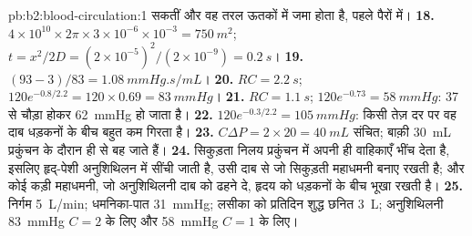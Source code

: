 \begin{solution}{pb:b2:blood-circulation:1}
सकतीं और वह तरल ऊतकों में जमा होता है, पहले पैरों में।
\textbf{18.} $4\times 10^{10}\times 2\pi\times 3\times 10^{-6}\times
10^{-3} = \qty{750}{m^2}$; $t = x^{2}/2D = (2\times 10^{-5})^{2}/
(2\times 10^{-9}) = \qty{0.2}{s}$।
\textbf{19.} $(93 - 3)/83 = \qty{1.08}{mmHg.s/mL}$।
\textbf{20.} $RC = \qty{2.2}{s}$; $120e^{-0.8/2.2} = 120\times 0.69 =
\qty{83}{mmHg}$।
\textbf{21.} $RC = \qty{1.1}{s}$; $120e^{-0.73} = \qty{58}{mmHg}$:
 37 से चौड़ा होकर \qty{62}{mmHg} हो जाता है।
\textbf{22.} $120e^{-0.3/2.2} = \qty{105}{mmHg}$: किसी तेज़ दर पर वह
दाब धड़कनों के बीच बहुत कम गिरता है।
\textbf{23.} $C\Delta P = 2\times 20 = \qty{40}{mL}$ संचित; बाक़ी
\qty{30}{mL} प्रकुंचन के दौरान ही  से बह जाते हैं।
\textbf{24.} सिकुड़ता निलय प्रकुंचन में अपनी ही वाहिकाएँ भींच देता
है, इसलिए हृद्-पेशी अनुशिथिलन में सींची जाती है, उसी
दाब से जो सिकुड़ती महाधमनी बनाए रखती है; और कोई कड़ी महाधमनी, जो
अनुशिथिलनी दाब को ढहने दे, हृदय को धड़कनों के बीच भूखा रखती है।
\textbf{25.} निर्गम \qty{5}{L/min}; धमनिका-पात \qty{31}{mmHg};
लसीका को प्रतिदिन शुद्ध छनित \qty{3}{L}; अनुशिथिलनी \qty{83}{mmHg}
$C = 2$ के लिए और \qty{58}{mmHg} $C = 1$ के लिए।
\end{solution}
